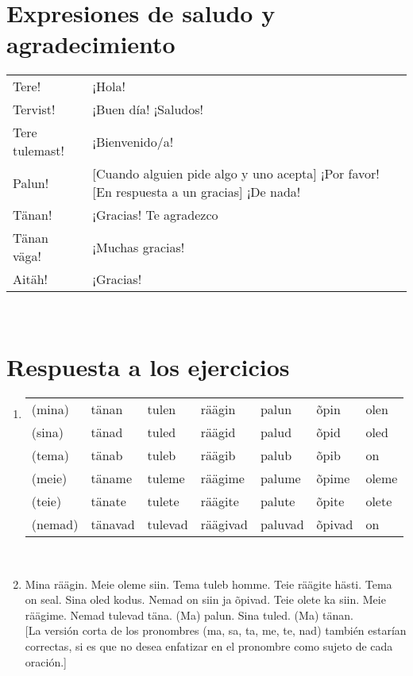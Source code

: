 \section*{\Large{Expresiones de saludo y agradecimiento}}

\begin{tabular}{ l p{8cm} }
	Tere!					& ¡Hola! \\
	Tervist!				& ¡Buen día! ¡Saludos! \\
	Tere tulemast! 			& ¡Bienvenido/a! \\
	Palun!					& \small{[Cuando alguien pide algo y uno acepta]} ¡Por favor! \small{[En respuesta a un gracias]} ¡De nada! \\
	Tänan!					& ¡Gracias! Te agradezco \\
	Tänan väga! 			& ¡Muchas gracias! \\
	Aitäh!					& ¡Gracias!
\end{tabular}\\ \bigskip

\section*{\Large{Respuesta a los ejercicios}}

\begin{enumerate}
\item 
\begin{tabular}{ l l l l l l l }
	(mina)	& tänan		& tulen		& räägin	& palun		& õpin		& olen \\
	(sina)	& tänad		& tuled		& räägid	& palud		& õpid		& oled \\
	(tema)	& tänab		& tuleb		& räägib	& palub		& õpib		& on \\
	(meie)	& täname	& tuleme	& räägime	& palume	& õpime		& oleme \\
	(teie)	& tänate	& tulete	& räägite	& palute	& õpite		& olete \\
	(nemad)	& tänavad	& tulevad	& räägivad	& paluvad	& õpivad	& on 
\end{tabular}\\ \bigskip
\item Mina räägin. Meie oleme siin. Tema tuleb homme. Teie räägite hästi. Tema on seal. Sina oled kodus. Nemad on siin ja õpivad. Teie olete ka siin. Meie räägime. Nemad tulevad täna. (Ma) palun. Sina tuled. (Ma) tänan.\\

[La versión corta de los pronombres (ma, sa, ta, me, te, nad) también estarían correctas, si es que no desea enfatizar en el pronombre como sujeto de cada oración.]
\end{enumerate}

